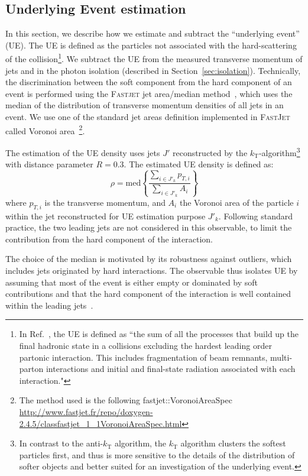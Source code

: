 \subsection{Underlying Event estimation}
\label{sec:UEsubtraction}
In this section, we describe how we estimate and subtract the ``underlying event'' (UE). The UE is defined as the particles not associated with the hard-scattering of the collision\footnote{In Ref.~\cite{ALICE:2011ac}, the UE is defined as ``the sum of all the processes that build up the final hadronic state in a collisions excluding the hardest leading order partonic interaction. This includes fragmentation of beam remnants, multi-parton interactions and initial and final-state radiation associated with each interaction."}. We subtract the UE from the measured transverse momentum of jets and in the photon isolation (described in Section~\ref{sec:isolation}). 
Technically, the discrimination between the soft component from the hard component of an event is performed using the \textsc{Fastjet} jet area/median method~\cite{Cacciari:2009dp}, which uses the median of the distribution of transverse momentum densities of all jets in an event. We use one of the standard jet areas definition implemented in \textsc{FastJet} called Voronoi area~\footnote{The method used is the following fastjet::VoronoiAreaSpec \url{http://www.fastjet.fr/repo/doxygen-2.4.5/classfastjet_1_1VoronoiAreaSpec.html} }.

The estimation of the UE density uses jets $J'$ reconstructed by the
$k_{\mathrm{T}}$-algorithm\footnote{In contrast to the anti-$k_{\mathrm{T}}$ algorithm, the $k_{\mathrm{T}}$ algorithm clusters the softest particles first, and thus is more sensitive to the details of the distribution of softer objects and better suited for an investigation of the underlying event.} with distance parameter $R=0.3$. The estimated UE
density is defined as:
\begin{equation}
  \rho = \mathrm{med} \left\{ \frac{\sum_{i\in J'_k}
    p_{T,i}}{\sum_{i\in J'_k} A_i} \right\}
\end{equation}
where $p_{T,i}$ is the transverse momentum, and $A_i$ the Voronoi area
of the particle $i$ within the jet reconstructed for UE estimation
purpose $J'_k$. Following standard practice, the two leading jets are not considered in this observable, to limit the contribution from the hard component of the interaction. 

The choice of the median is motivated by its robustness against outliers, which includes jets originated by hard interactions. The observable
thus isolates UE  by assuming that most of the event is either empty or dominated by soft contributions and that the hard component of the interaction is well contained within the leading jets~\citep{Cacciari:2009dp}. 

